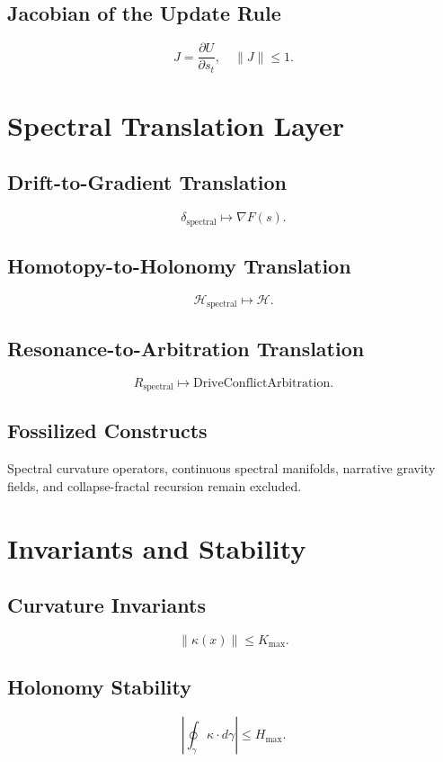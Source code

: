 \documentclass[11pt]{article}
\begin{document}
\subsection{Jacobian of the Update Rule}
\[
J = \frac{\partial U}{\partial s_t},
\quad \|J\| \le 1.
\]

\section{Spectral Translation Layer}

\subsection{Drift-to-Gradient Translation}
\[
\delta_{\text{spectral}} \mapsto \nabla F(s).
\]

\subsection{Homotopy-to-Holonomy Translation}
\[
\mathcal{H}_{\text{spectral}} \mapsto \mathcal{H}.
\]

\subsection{Resonance-to-Arbitration Translation}
\[
R_{\text{spectral}} \mapsto \mathrm{DriveConflictArbitration}.
\]

\subsection{Fossilized Constructs}
Spectral curvature operators, continuous spectral manifolds, narrative gravity
fields, and collapse-fractal recursion remain excluded.

\section{Invariants and Stability}

\subsection{Curvature Invariants}
\[
\|\kappa(x)\| \le K_{\max}.
\]

\subsection{Holonomy Stability}
\[
\left|\oint_{\gamma} \kappa \cdot d\gamma\right| \le H_{\max}.
\]
\end{document}
